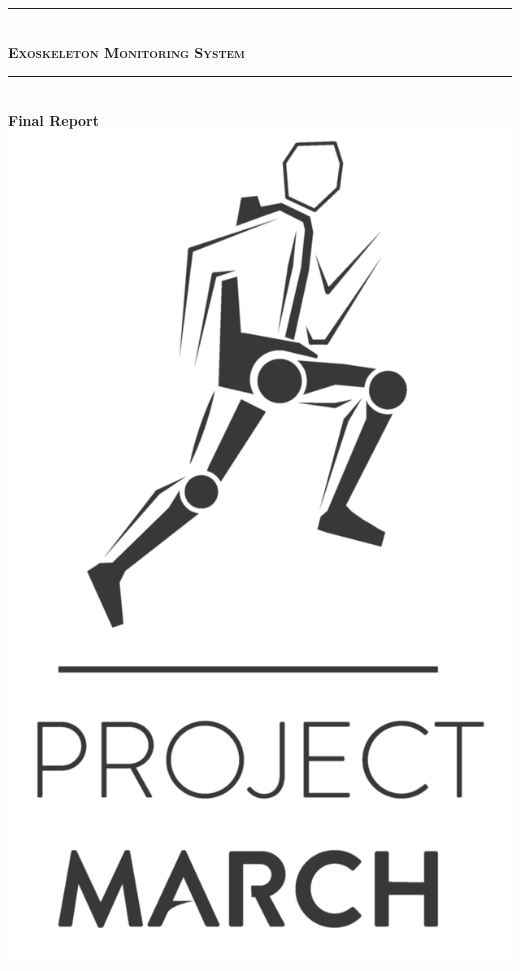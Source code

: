 \begin{titlepage}

\newcommand{\HRule}{\rule{\linewidth}{0.5mm}}
\centering

\HRule \\[0.4cm]
\textsc{ \huge \bfseries Exoskeleton Monitoring System}\\
\HRule \\[0.4cm]

{\LARGE \bfseries Final Report }\\[3.9cm]

\includegraphics[scale=0.1]{logo/Project_MARCH2}\\[1.4cm]



\end{titlepage}
